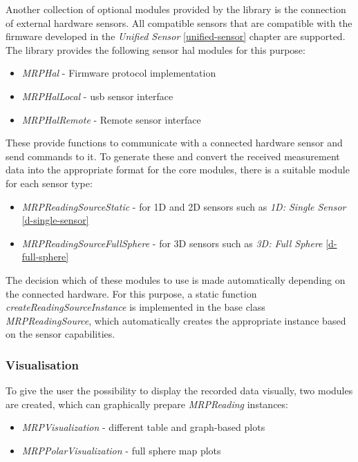 Another collection of optional modules provided by the library is the
connection of external hardware sensors. All compatible sensors that are
compatible with the firmware developed in the \emph{Unified Sensor}
\ref{unified-sensor} chapter are supported. The library provides the
following sensor \gls{hal} modules for this purpose:

\begin{itemize}
\tightlist
\item
  \emph{MRPHal} - Firmware protocol implementation
\item
  \emph{MRPHalLocal} - \gls{usb} sensor interface
\item
  \emph{MRPHalRemote} - Remote sensor interface
\end{itemize}

These provide functions to communicate with a connected hardware sensor
and send commands to it. To generate these and convert the received
measurement data into the appropriate format for the core modules, there
is a suitable module for each sensor type:

\begin{itemize}
\tightlist
\item
  \emph{MRPReadingSourceStatic} - for 1D and 2D sensors such as
  \emph{1D: Single Sensor} \ref{d-single-sensor}
\item
  \emph{MRPReadingSourceFullSphere} - for 3D sensors such as \emph{3D:
  Full Sphere} \ref{d-full-sphere}
\end{itemize}

The decision which of these modules to use is made automatically
depending on the connected hardware. For this purpose, a static function
\emph{createReadingSourceInstance} is implemented in the base class
\emph{MRPReadingSource}, which automatically creates the appropriate
instance based on the sensor capabilities.

\hypertarget{visualisation}{%
\subsubsection{Visualisation}\label{visualisation}}

To give the user the possibility to display the recorded data visually,
two modules are created, which can graphically prepare \emph{MRPReading}
instances:

\begin{itemize}
\tightlist
\item
  \emph{MRPVisualization} - different table and graph-based plots
\item
  \emph{MRPPolarVisualization} - full sphere map plots
\end{itemize}

